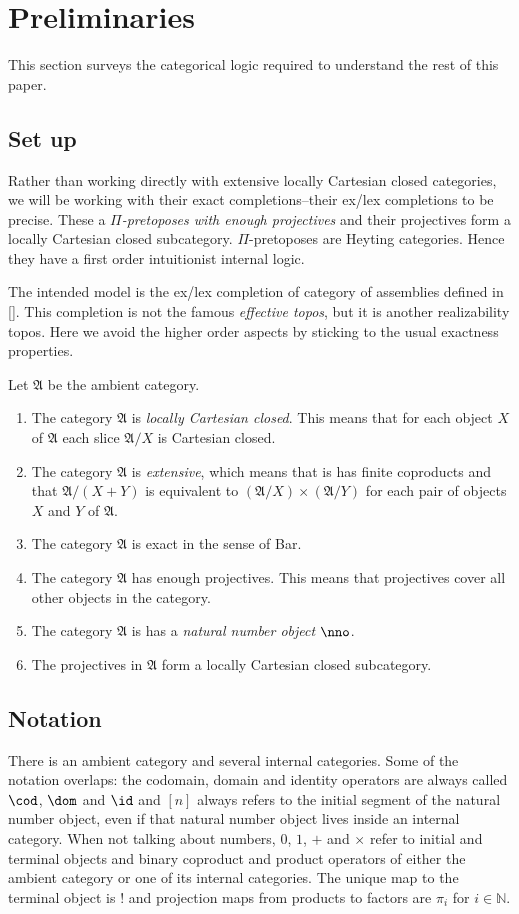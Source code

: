 \documentclass{tac}
\newcommand\N{\mathbb N}
\newcommand\bang{!}
\newcommand\citep[1]{[\cite{#1}]}
\newcommand\ambient{\mathfrak A}
\begin{document}
\section{Preliminaries}
This section surveys the categorical logic required to understand the rest of this paper.

\subsection{Set up}
Rather than working directly with extensive locally Cartesian closed categories, we will be working with their exact completions--their ex/lex completions to be precise. These a \emph{$\Pi$-pretoposes with enough projectives} and their projectives form a locally Cartesian closed subcategory. $\Pi$-pretoposes are Heyting categories. Hence they have a first order intuitionist internal logic.

The intended model is the ex/lex completion of category of assemblies defined in \citep{MR1097022,MR1023803,MR2479466}. This completion is not the famous \emph{effective topos}, but it is another realizability topos. Here we avoid the higher order aspects by sticking to the usual exactness properties.

Let $\ambient$ be the ambient category.
\begin{enumerate}
\item The category $\ambient$ is \emph{locally Cartesian closed}. This means that for each object $X$ of $\ambient$ each slice $\ambient/X$ is Cartesian closed.
\item The category $\ambient$ is \emph{extensive}, which means that is has finite coproducts and that $\ambient/(X+Y)$ is equivalent to $(\ambient/X)\times(\ambient/Y)$ for each pair of objects $X$ and $Y$ of $\ambient$.
\item The category $\ambient$ is exact in the sense of Bar.
\item The category $\ambient$ has enough projectives. This means that projectives cover all other objects in the category.
\item The category $\ambient$ is has a \emph{natural number object} $\nno$.
\item The projectives in $\ambient$ form a locally Cartesian closed subcategory.
\end{enumerate}

\subsection{Notation} There is an ambient category and several internal categories. Some of the notation overlaps: the codomain, domain and identity operators are always called $\cod$, $\dom$ and $\id$ and $[n]$ always refers to the initial segment of the natural number object, even if that natural number object lives inside an internal category. When not talking about numbers, $0$, $1$, $+$ and $\times$ refer to initial and terminal objects and binary coproduct and product operators of either the ambient category or one of its internal categories. The unique map to the terminal object is $\bang$ and projection maps from products to factors are $\pi_i$ for $i\in \N$.
\end{document}
